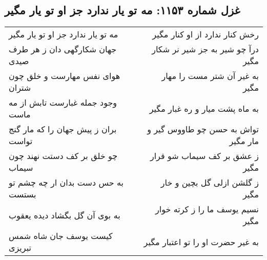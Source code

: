\begin{center}
\section*{غزل شماره ۱۱۵۳: مه تو یار ندارد جز او تو یار مگیر}
\label{sec:1153}
\begin{longtable}{l p{0.5cm} r}
مه تو یار ندارد جز او تو یار مگیر
&&
رخش کنار ندارد از او کنار مگیر
\\
جهان شکارگهی دان ز هر طرف صیدی
&&
درآ چو شیر به جز شیر نر شکار مگیر
\\
هوای نفس مهارست و خلق چون شتران
&&
به غیر آن شتر مست را مهار مگیر
\\
وجود جمله غبارست تابش از مه ماست
&&
به ماه پشت میار و ره غبار مگیر
\\
بران ز پیش جهان را که مار گنج تواست
&&
تواش به حسن چو طاووس گیر و مار مگیر
\\
چو خلق بر کف دستت نهند چون سیماب
&&
ز عشق بر کف سیماب شو قرار مگیر
\\
به حس دست بدان ار چه چشم تو بستست
&&
ز گلشن ازلی گل بچین و خار مگیر
\\
به بوی آن گل بگشاد دیده یعقوب
&&
نسیم یوسف ما را ز کرته خوار مگیر
\\
کیست یوسف جان شاه شمس تبریزی
&&
به غیر حضرت او را تو اعتبار مگیر
\\
\end{longtable}
\end{center}
